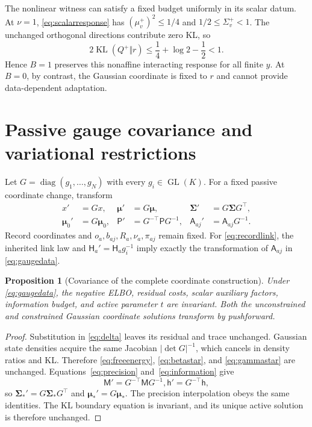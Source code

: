\documentclass[11pt]{article}
\newtheorem{proposition}[theorem]{Proposition}
\newcommand{\KL}{\operatorname{KL}}
\newcommand{\GL}{\operatorname{GL}}
\newcommand{\diag}{\operatorname{diag}}
\newcommand{\m}{\boldsymbol{\mu}}
\newcommand{\Sig}{\boldsymbol{\Sigma}}
\begin{document}
The nonlinear witness can satisfy a fixed budget uniformly in its scalar datum. At $\nu=1$, \eqref{eq:scalarresponse} has $(\mu_v^+)^2\le1/4$ and $1/2\le\Sigma_v^+<1$. The unchanged orthogonal directions contribute zero KL, so
\begin{equation}
2\KL(Q^+\Vert r)
\le\frac14+\log2-\frac12<1.
\label{eq:witnessbudget}
\end{equation}
Hence $B=1$ preserves this nonaffine interacting response for all finite $y$. At $B=0$, by contrast, the Gaussian coordinate is fixed to $r$ and cannot provide data-dependent adaptation.
\section{Passive gauge covariance and variational restrictions}
\label{sec:gauge}

Let $G=\diag(g_1,\ldots,g_N)$ with every $g_i\in\GL(K)$. For a fixed passive coordinate change, transform
\begin{align}
x'&=Gx,& \m'&=G\m,& \Sig'&=G\Sig G^\top,\nonumber\\
\m_0'&=G\m_0,& \mathsf P'&=G^{-\top}\mathsf P G^{-1},&
\mathsf A_{aj}'&=\mathsf A_{aj}G^{-1}.
\label{eq:gaugedata}
\end{align}
Record coordinates and $o_a,b_{aj},R_a,\nu_a,\pi_{aj}$ remain fixed. For \eqref{eq:recordlink}, the inherited link law and $\mathsf H_a'=\mathsf H_a g_i^{-1}$ imply exactly the transformation of $\mathsf A_{aj}$ in \eqref{eq:gaugedata}.

\begin{proposition}[Covariance of the complete coordinate construction]
\label{prop:gauge}
Under \eqref{eq:gaugedata}, the negative ELBO, residual costs, scalar auxiliary factors, information budget, and active parameter $t$ are invariant. Both the unconstrained and constrained Gaussian coordinate solutions transform by pushforward.
\end{proposition}
\begin{proof}
Substitution in \eqref{eq:delta} leaves its residual and trace unchanged. Gaussian state densities acquire the same Jacobian $|\det G|^{-1}$, which cancels in density ratios and KL. Therefore \eqref{eq:freeenergy}, \eqref{eq:betastar}, and \eqref{eq:gammastar} are unchanged. Equations~\eqref{eq:precision} and~\eqref{eq:information} give
\begin{equation}
\mathsf M'=G^{-\top}\mathsf M G^{-1},
\mathsf h'=G^{-\top}\mathsf h,
\label{eq:naturaltransform}
\end{equation}
so $\Sig_*'=G\Sig_*G^\top$ and $\m_*'=G\m_*$. The precision interpolation obeys the same identities. The KL boundary equation is invariant, and its unique active solution is therefore unchanged.
\end{proof}
\end{document}
